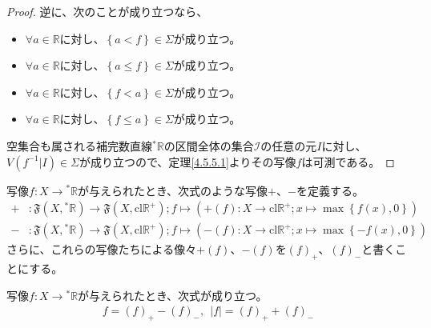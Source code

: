 \documentclass[dvipdfmx]{jsarticle}
\begin{document}
\begin{proof}
逆に、次のことが成り立つなら、
\begin{itemize}
\item
  $\forall a \in \mathbb{R}$に対し、$\left\{ a < f \right\} \in \varSigma$が成り立つ。
\item
  $\forall a \in \mathbb{R}$に対し、$\left\{ a \leq f \right\} \in \varSigma$が成り立つ。
\item
  $\forall a \in \mathbb{R}$に対し、$\left\{ f < a \right\} \in \varSigma$が成り立つ。
\item
  $\forall a \in \mathbb{R}$に対し、$\left\{ f \leq a \right\} \in \varSigma$が成り立つ。
\end{itemize}
空集合も属される補完数直線${}^{*}\mathbb{R}$の区間全体の集合$\mathcal{I}$の任意の元$I$に対し、$V\left( f^{- 1}|I \right) \in \varSigma$が成り立つので、定理\ref{4.5.5.1}よりその写像$f$は可測である。
\end{proof}
\begin{dfn}
写像$f:X \rightarrow{}^{*}\mathbb{R}$が与えられたとき、次式のような写像$+$、$-$を定義する。
\begin{align*}
+&:\mathfrak{F}\left( X,{}^{*}\mathbb{R} \right)\mathfrak{\rightarrow F}\left( X,\mathrm{cl}\mathbb{R}^{+} \right);f \mapsto \left( + (f):X \rightarrow \mathrm{cl}\mathbb{R}^{+};x \mapsto \max\left\{ f(x),0 \right\} \right)\\
-&:\mathfrak{F}\left( X,{}^{*}\mathbb{R} \right)\mathfrak{\rightarrow F}\left( X,\mathrm{cl}\mathbb{R}^{+} \right);f \mapsto \left( - (f):X \rightarrow \mathrm{cl}\mathbb{R}^{+};x \mapsto \max\left\{ - f(x),0 \right\} \right)
\end{align*}
さらに、これらの写像たちによる像々$+ (f)$、$- (f)$を$(f)_{+}$、$(f)_{-}$と書くことにする。
\end{dfn}
\begin{thm}\label{4.5.5.10}
写像$f:X \rightarrow{}^{*}\mathbb{R}$が与えられたとき、次式が成り立つ。
\begin{align*}
f = (f)_{+} - (f)_{-},\ \ |f| = (f)_{+} + (f)_{-}
\end{align*}
\end{thm}
\end{document}
